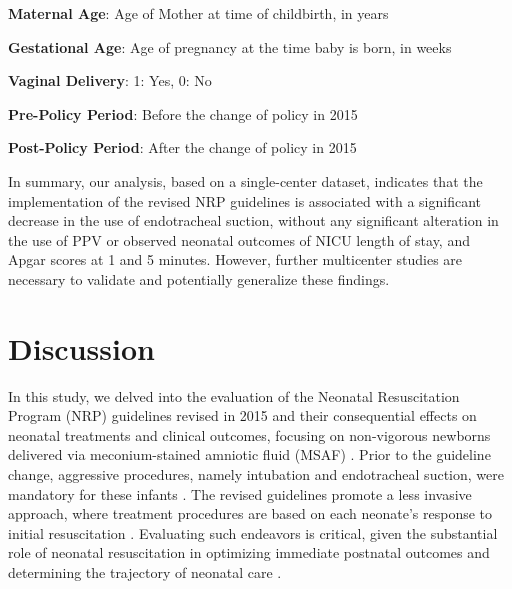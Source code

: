 \documentclass[11pt]{article}
\begin{document}
\begin{table}[h]
\caption{Comparison of the distribution of confounding variables between the pre-guideline and post-guideline groups}
\label{table:confounding_variables}
\begin{threeparttable}
\renewcommand{\TPTminimum}{\linewidth}
\begin{tablenotes}
\footnotesize
\item \textbf{Maternal Age}: Age of Mother at time of childbirth, in years
\item \textbf{Gestational Age}: Age of pregnancy at the time baby is born, in weeks
\item \textbf{Vaginal Delivery}: 1: Yes, 0: No
\item \textbf{Pre-Policy Period}: Before the change of policy in 2015
\item \textbf{Post-Policy Period}: After the change of policy in 2015
\end{tablenotes}
\end{threeparttable}
\end{table}


In summary, our analysis, based on a single-center dataset, indicates that the implementation of the revised NRP guidelines is associated with a significant decrease in the use of endotracheal suction, without any significant alteration in the use of PPV or observed neonatal outcomes of NICU length of stay, and Apgar scores at 1 and 5 minutes. However, further multicenter studies are necessary to validate and potentially generalize these findings.

\section*{Discussion}

In this study, we delved into the evaluation of the Neonatal Resuscitation Program (NRP) guidelines revised in 2015 and their consequential effects on neonatal treatments and clinical outcomes, focusing on non-vigorous newborns delivered via meconium-stained amniotic fluid (MSAF) \cite{Selewski2015NeonatalAK, Stoll2010NeonatalOO}. Prior to the guideline change, aggressive procedures, namely intubation and endotracheal suction, were mandatory for these infants \cite{Boyle2015NeonatalOA}. The revised guidelines promote a less invasive approach, where treatment procedures are based on each neonate's response to initial resuscitation \cite{Carbine2000VideoRA}. Evaluating such endeavors is critical, given the substantial role of neonatal resuscitation in optimizing immediate postnatal outcomes and determining the trajectory of neonatal care \cite{Salvatore2020NeonatalMA}.
\end{document}

